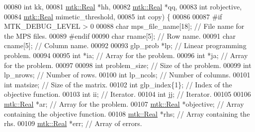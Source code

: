 \begin{DoxyCode}
00080                                                    \textcolor{keywordtype}{int} kk,
00081                                                    \hyperlink{group__c01-roots_gac080bbbf5cbb5502c9f00405f894857d}{mtk::Real} *hh,
00082                                                    \hyperlink{group__c01-roots_gac080bbbf5cbb5502c9f00405f894857d}{mtk::Real} *qq,
00083                                                    \textcolor{keywordtype}{int} robjective,
00084                                                    \hyperlink{group__c01-roots_gac080bbbf5cbb5502c9f00405f894857d}{mtk::Real} mimetic\_threshold,
00085                                                    \textcolor{keywordtype}{int} copy) \{
00086 
00087 \textcolor{preprocessor}{  #if MTK\_DEBUG\_LEVEL > 0}
00088   \textcolor{keywordtype}{char} mps\_file\_name[18]; \textcolor{comment}{// File name for the MPS files.}
00089 \textcolor{preprocessor}{  #endif}
00090   \textcolor{keywordtype}{char} rname[5];          \textcolor{comment}{// Row name.}
00091   \textcolor{keywordtype}{char} cname[5];          \textcolor{comment}{// Column name.}
00092 
00093   glp\_prob *lp; \textcolor{comment}{// Linear programming problem.}
00094 
00095   \textcolor{keywordtype}{int} *ia;  \textcolor{comment}{// Array for the problem.}
00096   \textcolor{keywordtype}{int} *ja;  \textcolor{comment}{// Array for the problem.}
00097 
00098   \textcolor{keywordtype}{int} problem\_size; \textcolor{comment}{// Size of the problem.}
00099   \textcolor{keywordtype}{int} lp\_nrows;     \textcolor{comment}{// Number of rows.}
00100   \textcolor{keywordtype}{int} lp\_ncols;     \textcolor{comment}{// Number of columns.}
00101   \textcolor{keywordtype}{int} matsize;      \textcolor{comment}{// Size of the matrix.}
00102   \textcolor{keywordtype}{int} glp\_index\{1\}; \textcolor{comment}{// Index of the objective function.}
00103   \textcolor{keywordtype}{int} ii;           \textcolor{comment}{// Iterator.}
00104   \textcolor{keywordtype}{int} jj;           \textcolor{comment}{// Iterator.}
00105 
00106   \hyperlink{group__c01-roots_gac080bbbf5cbb5502c9f00405f894857d}{mtk::Real} *ar;            \textcolor{comment}{// Array for the problem.}
00107   \hyperlink{group__c01-roots_gac080bbbf5cbb5502c9f00405f894857d}{mtk::Real} *objective;     \textcolor{comment}{// Array containing the objective function.}
00108   \hyperlink{group__c01-roots_gac080bbbf5cbb5502c9f00405f894857d}{mtk::Real} *rhs;           \textcolor{comment}{// Array containing the rhs.}
00109   \hyperlink{group__c01-roots_gac080bbbf5cbb5502c9f00405f894857d}{mtk::Real} *err;           \textcolor{comment}{// Array of errors.}

\end{DoxyCode}

